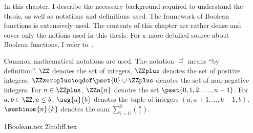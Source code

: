 \myminitoc

In this chapter, I describe the necessary background required to understand the thesis, as well as notations and definitions used. The framework of Boolean functions is extensively used. The contents of this chapter are rather dense and cover only the notions used in this thesis. For a more detailed source about Boolean functions, I refer to~\cite{Carlet,CarletVectorial}.

Common mathematical notations are used. The notation $\eqdef$ means ``by definition''. $\ZZ$ denotes the set of integers, $\ZZplus$ denotes the set of positive integers, $\ZZzeroplus \eqdef \pset{0} \cup \ZZplus$ denotes the set of non-negative integers. For $n \in \ZZplus$, $\ZZn{n}$ denotes the set $\pset{0,1,2,\ldots,n-1}$. 
For $a,b \in \ZZ, a\le b$, $\seg{a}{b}$ denotes the tuple of integers $(a, a+1, \ldots, b-1, b)$.
$\sumbinom{n}{k}$ denotes the sum $\sum_{i=0}^{k}\binom{n}{i}$.

{1Boolean.tex}
{2lindiff.tex}
